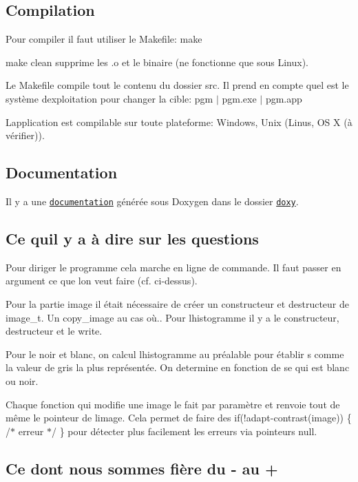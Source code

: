\subsection*{Compilation }

Pour compiler il faut utiliser le Makefile\+: {\ttfamily make}

{\ttfamily make clean} supprime les .o et le binaire (ne fonctionne que sous Linux).

Le Makefile compile tout le contenu du dossier src. Il prend en compte quel est le système d\textquotesingle{}exploitation pour changer la cible\+: {\ttfamily pgm $\vert$ pgm.\+exe $\vert$ pgm.\+app}

L\textquotesingle{}application est compilable sur toute plateforme\+: Windows, Unix (Linus, OS X (à vérifier)).

\subsection*{Documentation }

Il y a une \href{doxy/html/index.html}{\tt documentation} générée sous Doxygen dans le dossier \href{doxy/}{\tt doxy}.

\subsection*{Ce qu\textquotesingle{}il y a à dire sur les questions }

Pour diriger le programme cela marche en ligne de commande. Il faut passer en argument ce que l\textquotesingle{}on veut faire (cf. ci-\/dessus).

Pour la partie image il était nécessaire de créer un constructeur et destructeur de image\+\_\+t. Un copy\+\_\+image au cas où.. Pour l\textquotesingle{}histogramme il y a le constructeur, destructeur et le write.

Pour le noir et blanc, on calcul l\textquotesingle{}histogramme au préalable pour établir s comme la valeur de gris la plus représentée. On determine en fonction de se qui est blanc ou noir.

Chaque fonction qui modifie une image le fait par paramètre et renvoie tout de même le pointeur de l\textquotesingle{}image. Cela permet de faire des {\ttfamily if(!adapt-\/contrast(image)) \{ /$\ast$ erreur $\ast$/ \}} pour détecter plus facilement les erreurs via pointeurs null.

\subsection*{Ce dont nous sommes fière du -\/ au + }


